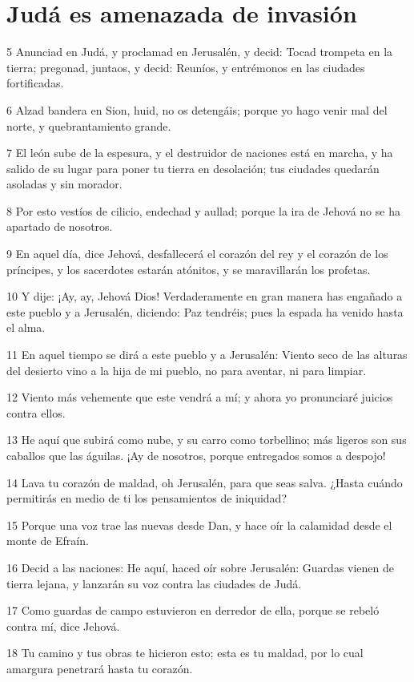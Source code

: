 \section*{Judá es amenazada de invasión}

\par 5 Anunciad en Judá, y proclamad en Jerusalén, y decid: Tocad trompeta en la tierra; pregonad, juntaos, y decid: Reuníos, y entrémonos en las ciudades fortificadas.
\par 6 Alzad bandera en Sion, huid, no os detengáis; porque yo hago venir mal del norte, y quebrantamiento grande.
\par 7 El león sube de la espesura, y el destruidor de naciones está en marcha, y ha salido de su lugar para poner tu tierra en desolación; tus ciudades quedarán asoladas y sin morador.
\par 8 Por esto vestíos de cilicio, endechad y aullad; porque la ira de Jehová no se ha apartado de nosotros.
\par 9 En aquel día, dice Jehová, desfallecerá el corazón del rey y el corazón de los príncipes, y los sacerdotes estarán atónitos, y se maravillarán los profetas.
\par 10 Y dije: ¡Ay, ay, Jehová Dios! Verdaderamente en gran manera has engañado a este pueblo y a Jerusalén, diciendo: Paz tendréis; pues la espada ha venido hasta el alma.
\par 11 En aquel tiempo se dirá a este pueblo y a Jerusalén: Viento seco de las alturas del desierto vino a la hija de mi pueblo, no para aventar, ni para limpiar.
\par 12 Viento más vehemente que este vendrá a mí; y ahora yo pronunciaré juicios contra ellos.
\par 13 He aquí que subirá como nube, y su carro como torbellino; más ligeros son sus caballos que las águilas. ¡Ay de nosotros, porque entregados somos a despojo!
\par 14 Lava tu corazón de maldad, oh Jerusalén, para que seas salva. ¿Hasta cuándo permitirás en medio de ti los pensamientos de iniquidad?
\par 15 Porque una voz trae las nuevas desde Dan, y hace oír la calamidad desde el monte de Efraín.
\par 16 Decid a las naciones: He aquí, haced oír sobre Jerusalén: Guardas vienen de tierra lejana, y lanzarán su voz contra las ciudades de Judá.
\par 17 Como guardas de campo estuvieron en derredor de ella, porque se rebeló contra mí, dice Jehová.
\par 18 Tu camino y tus obras te hicieron esto; esta es tu maldad, por lo cual amargura penetrará hasta tu corazón.
